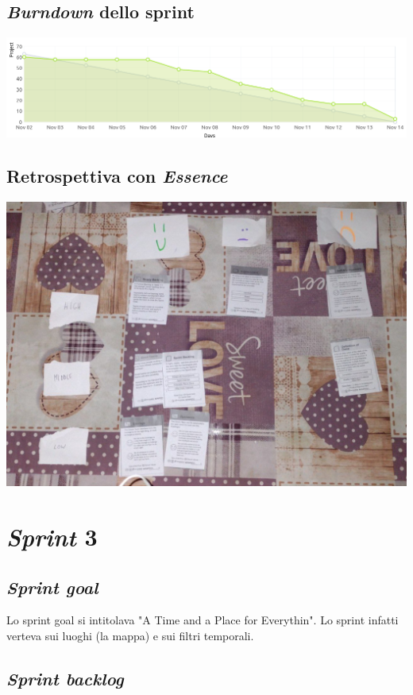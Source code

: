 \documentclass{article}
\begin{document}
\subsection{\emph{Burndown} dello sprint}

\includegraphics[width=\textwidth]{burndown-2}

\subsection{Retrospettiva con \emph{Essence}}

\includegraphics[width=\textwidth]{essence-2}

\section{\emph{Sprint} 3}

\subsection{\emph{Sprint goal}}

Lo sprint goal si intitolava "A Time and a Place for Everythin". Lo sprint
infatti verteva sui luoghi (la mappa) e sui filtri temporali.

\subsection{\emph{Sprint backlog}}
\end{document}
